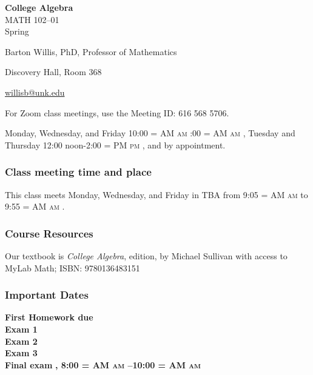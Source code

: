 \documentclass[12pt]{article}
\makeatletter
\newcounter{on}\setcounter{on}{0}
\newcounter{ex}\setcounter{ex}{0}
\newenvironment{mypar}[2]
  {\begin{list}{}%
    {\setlength\leftmargin{#1}
    \setlength\rightmargin{#2}}
    \item[]}
  {\end{list}}
\renewenvironment{description}[0]{\begin{compactdesc}}{\end{compactdesc}}
\DeclareRobustCommand{\maybefakesc}[1]{%
  \ifnum\pdfstrcmp{\f@series}{\bfdefault}=\z@
    {\fontsize{\dimexpr0.8\dimexpr\f@size pt\relax}{0}\selectfont\uppercase{#1}}%
  \else
    \textsc{#1}%
  \fi
}
\newcommand\AM{\maybefakesc{am}\xspace}
\newcommand\PM{\maybefakesc{pm}\xspace}
\newcommand{\coursename}{College Algebra}
\newcommand{\coursenumber}{MATH 102}
\newcommand{\sectionnumber}{01}
\newcommand{\term}{Spring }
\newcommand{\room}{TBA}
\newcommand{\meetingtime}{This class meets Monday, Wednesday, and Friday in \room \/  from 9:05 \AM to 9:55 \AM.}
\newcommand{\officehours}{Monday, Wednesday, and Friday 10:00\AM-11:00\AM,
    Tuesday and Thursday 12:00 noon-2:00\PM, and by appointment.}
\makeatother
\begin{document}
\cleanlookdateon%
\shortdate
\printyearoff
\large
\begin{center}
    \textbf{\coursename}  \\
    {\coursenumber--\sectionnumber} \\
     {\term \the\year} \\
\end{center}

\vskip0.25in
\normalsize


\begin{center}
\begin{description}
    \item[Instructor:] Barton Willis, PhD, Professor of Mathematics
    \item[Office:]  Discovery Hall, Room 368
    \item[\phone:]   
    \item[\Email:]    \href{mailto:willisb@unk.edu}{willisb@unk.edu}
    \item[Zoom for classes:] For Zoom class meetings, use the Meeting ID: 616 568 5706. 
    \item[Office Hours:] \officehours
  \end{description}
\end{center}

\subsubsection*{Class meeting time and place}

\meetingtime



\subsubsection*{Course Resources}

\noindent Our textbook is \emph{College Algebra},  edition, by Michael 
Sullivan with access to MyLab Math; ISBN: 9780136483151


\subsubsection*{Important Dates}

\begin{mypar}{0.25in}{0.25in} 

    \textbf{First Homework due} \dotfill  \textbf{}  \\
    \textbf{Exam 1} \dotfill \textbf{}  \\
    \textbf{Exam 2} \dotfill  \textbf{} \\
    \textbf{Exam 3} \dotfill \textbf{} \\
    \textbf{Final exam} \dotfill  \textbf{, 8:00 \AM--10:00 \AM}
\end{mypar}
\end{document}
